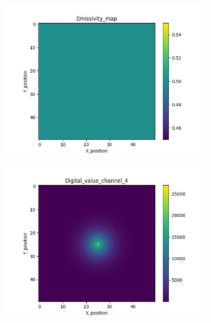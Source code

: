 {\begin{figure}[htbp]
\begin{minipage}{\textwidth}
    \end{minipage}\\
    \begin{minipage}{\textwidth}
        \centering
        \begin{subfigure}{0.45\textwidth}
            \includegraphics[width=\textwidth]{figures/raw_data/1/emi_field.jpg}
        \end{subfigure}
        \begin{subfigure}{0.45\textwidth}
            \centering
            \includegraphics[width=\textwidth]{figures/raw_data/1/digital_value_channel_4.jpg}
        \end{subfigure}
        \label{fig: raw_data_1}

\end{minipage}
\end{figure}}

